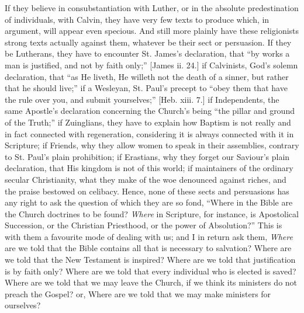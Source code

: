 If they believe in consubstantiation with Luther, or in the
absolute predestination of individuals, with Calvin, they have very
few texts to produce which, in argument, will appear even specious.
And still more plainly have these religionists strong texts actually
against them, whatever be their sect or persuasion. If they be
Lutherans, they have to encounter St. James's declaration, that
``by works a man is justified, and not by faith only;'' [James
ii. 24.] if Calvinists, God's solemn declaration, that ``as He
liveth, He willeth not the death of a sinner, but rather that he
should live;'' if a Wesleyan, St. Paul's precept to ``obey
them that have the rule over you, and submit yourselves;'' [Heb.
xiii. 7.] if Independents, the same Apostle's declaration concerning
the Church's being ``the pillar and ground of the Truth;'' if
Zuinglians, they have to explain how Baptism is not really and in fact
connected with regeneration, considering it is always connected with
it in Scripture; if Friends, why they allow women to speak in their
assemblies, contrary to St. Paul's plain prohibition; if Erastians,
why they forget our Saviour's plain declaration, that His kingdom is
not of this world; if maintainers of the ordinary secular
Christianity, what they make of the woe denounced against riches, and
the praise bestowed on celibacy. Hence, none of these sects and
persuasions has any right to ask the question of which they are so
fond, ``Where in the Bible are the Church doctrines to be found? \emph{Where}
in Scripture, for instance, is Apostolical Succession, or the
Christian Priesthood, or the power of Absolution?'' This is with
them a favourite mode of dealing with us; and I in return ask them, \emph{Where}
are we told that the Bible contains all that is necessary to
salvation? Where are we told that the New Testament is inspired? Where
are we told that justification is by faith only? Where are we told
that every individual who is elected is saved? Where are we told that
we may leave the Church, if we think its ministers do not preach the
Gospel? or, Where are we told that we may make ministers for
ourselves?

